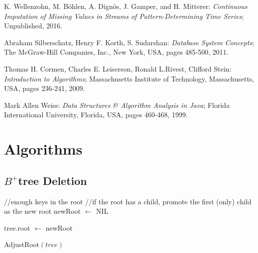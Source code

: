 \documentclass[abstracton,12pt,oneside]{scrreprt}
\begin{document}
\begin{thebibliography}{99}
	
	
	 K. Wellenzohn, M. Böhlen, A. Dignös, J. Gamper, and H. Mitterer: \emph{Continuous Imputation of Missing Values in Streams of Pattern-Determining Time Series}; Unpublished, 2016.
	
	 Abraham Silberschatz, Henry F. Korth, S. Sudarshan: \emph{Database System Concepts}; The McGraw-Hill Companies, Inc., New York, USA, pages 485-500, 2011. 
	
	 Thomas H. Cormen, Charles E. Leiserson, Ronald L.Rivest, Clifford Stein: \emph{Introduction to Algorithms}; Massachusetts Institute of Technology, Massachusetts, USA, pages 236-241, 2009. 
	
	 Mark Allen Weiss: \emph{Data Structures \& Algorithm Analysis in Java}; Florida International University, Florida, USA, pages 460-468, 1999. 
	
	
\end{thebibliography}




\appendix%

\appendixpage


\addappheadtotoc
\chapter{Algorithms}

\label{app:Algo}

\section{$B^+$tree Deletion}
\label{app:Del}

\begin{algorithm}[H]
	\IncMargin{1em}
	\SetAlgoLined
	\DontPrintSemicolon
	
	//enough keys in the root\;
	//if the root has a child, promote the first (only) child as the new root\;
	{
		newRoot $\leftarrow$ NIL\;
	}
	
	tree.root $\leftarrow$ newRoot\;
	
	\caption{AdjustRoot$(tree)$}	\label{adjustTheRoot}
\end{algorithm}
\end{document}
